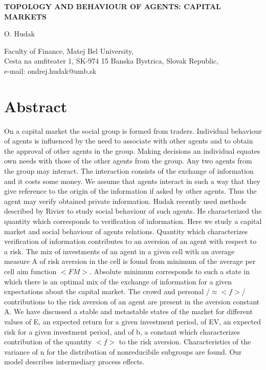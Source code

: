 \documentclass[10pt]{article}
\begin{document}
\begin{center}
{\bf \huge
TOPOLOGY AND BEHAVIOUR OF AGENTS: CAPITAL MARKETS
}
\end{center}


\begin{center}
O. Hudak
\end{center}



\begin{center}
Faculty of Finance, Matej Bel University, \\ Cesta na amfiteater 1, SK-974 15 Banska Bystrica, Slovak Republic,\\
e-mail: ondrej.hudak@umb.sk
\end{center}

\newpage
\section*{Abstract}
On a capital market the social group is formed from traders. Individual behaviour of agents is influenced  by the need to associate with other agents and to obtain the approval of other agents in the group. Making decisions an individual equates own needs with those of the other agents from the group. Any two agents from the group may interact. The interaction consists of the exchange of information and it costs some money. We assume that agents interact in such a way that they give reference to the origin of the information if asked by other agents. Thus the agent may verify obtained private information. Hudak recently  used methods described by Rivier to study social behaviour of such agents. He characterized the quantity which corresponds to verification of information. Here we study a capital market and social behaviour of agents relations. Quantity which characterizes verification of information contributes to an aversion of an agent with respect to a risk. The mix of investments of an agent in a given cell with an average measure A of risk aversion in the cell is found from minimum of the average  per cell aim function $<FM>$. Absolute minimum corresponds to such a state in which there is an optimal mix of the exchange of information for a given expectations about the capital market. The crowd and personal /$\approx <f>$/ contributions to the risk aversion of an agent are present in the aversion constant A.  We have discussed a stable and metastable states of the market for different values of E, an expected return for a given investment period, of EV, an expected risk for a given investment period, and of b, a constant which characterizes contribution of the quantity $<f>$ to the risk aversion. Characteristics of the variance of n for the distribution of nonreducibile subgroups are found. Our model describes intermediary process effects. 
\end{document}
